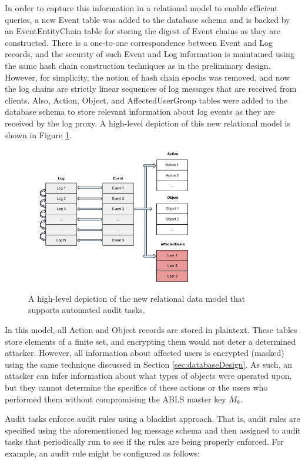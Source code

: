 \documentclass{sig-alternate}
\begin{document}
In order to capture this information in a relational model to enable efficient queries, a new Event table was added
to the database schema and is backed by an EventEntityChain table for storing the digest of Event chains as they
are constructed. There is a one-to-one correspondence between Event and Log records, and the security of such Event
and Log information is maintained using the same hash chain construction techniques as in the preliminary design.
However, for simplicity, the notion of hash chain epochs was removed, and now the log chains are strictly linear sequences
of log messages that are received from clients.
Also, Action, Object, and AffectedUserGroup tables were added to the database schema to store relevant information
about log events as they are received by the log proxy. A high-level depiction of this new relational model is shown
in Figure \ref{fig:design2}.

\begin{figure}[ht!]
\begin{center}
\includegraphics[width=3in]{images/relational_design_v2.pdf}
\caption{A high-level depiction of the new relational data model that supports automated audit tasks.}
\label{fig:design2}
\end{center}
\end{figure}

In this model, all Action and Object records are stored in plaintext. These tables store elements of a finite set, and
encrypting them would not deter a determined attacker. However, all information about affected users is encrypted 
(masked) using the same technique discussed in Section \ref{sec:databaseDesign}. As such, an attacker can infer
information about what types of objects were operated upon, but they cannot determine the specifics of these actions
or the users who performed them without compromising the ABLS master key $M_k$. 

Audit tasks enforce audit rules using a blacklist approach. That is, audit rules are specified using the aforementioned 
log message schema and then assigned to audit tasks that periodically run to see if the rules are being properly enforced.
For example, an audit rule might be configured as follows:
\end{document}

